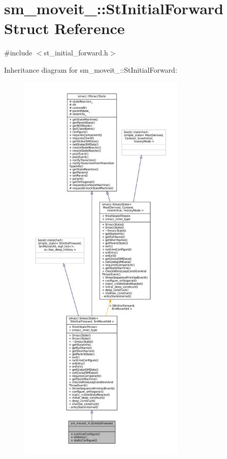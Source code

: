 \hypertarget{structsm__moveit__4_1_1StInitialForward}{}\section{sm\+\_\+moveit\+\_\+:\+:St\+Initial\+Forward Struct Reference}
\label{structsm__moveit__4_1_1StInitialForward}


{\ttfamily \#include $<$st\+\_\+initial\+\_\+forward.\+h$>$}



Inheritance diagram for sm\+\_\+moveit\+\_\+:\+:St\+Initial\+Forward\+:
\nopagebreak
\begin{figure}[H]
\begin{center}
\leavevmode
\includegraphics[height=550pt]{structsm__moveit__4_1_1StInitialForward__inherit__graph}
\end{center}
\end{figure}


